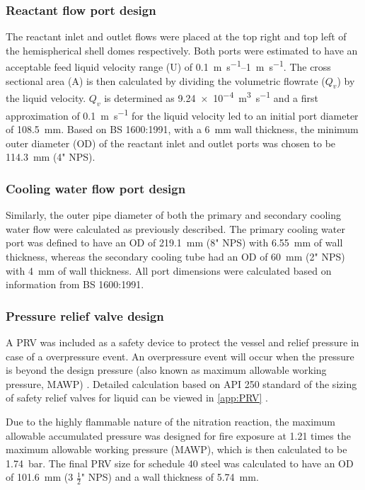 \subsubsection{Reactant flow port design}
The reactant inlet and outlet flows were placed at the top right and top left of the hemispherical shell domes respectively. Both ports were estimated to have an acceptable feed liquid velocity range (U) of \SIrange{0.1}{1}{\m\per\s}. The cross sectional area (A) is then calculated by dividing the volumetric flowrate ($Q_v$) by the liquid velocity. $Q_v$ is determined as \SI{9.24e-4}{\cubic\m\per\s} and a first approximation of \SI{0.1}{\m\per\s} for the liquid velocity led to an initial port diameter of \SI{108.5}{\milli \metre}. Based on BS 1600:1991, with a \SI{6}{\milli \metre} wall thickness, the minimum outer diameter (OD) of the reactant inlet and outlet ports was chosen to be \SI{114.3}{\milli \metre} (4" NPS). 

\subsubsection{Cooling water flow port design}
Similarly, the outer pipe diameter of both the primary and secondary cooling water flow were calculated as previously described. The primary cooling water port was defined to have an OD of \SI{219.1}{\milli \metre} (8" NPS) with \SI{6.55}{\milli \metre} of wall thickness, whereas the secondary cooling tube had an OD of \SI{60}{\milli \metre} (2" NPS) with \SI{4}{\milli \metre} of wall thickness. All port dimensions were calculated based on information from BS 1600:1991. 

\subsubsection{Pressure relief valve design}
A PRV was included as a safety device to protect the vessel and relief pressure in case of a overpressure event. An overpressure event will occur when the pressure is beyond the design pressure (also known as maximum allowable working pressure, MAWP) \cite{marsha_lecture_nodate}. Detailed calculation based on API 250 standard of the sizing of safety relief valves for liquid can be viewed in \ref{app:PRV} \cite{api_standard_520_sizing_2013}.

Due to the highly flammable nature of the nitration reaction, the maximum allowable accumulated pressure was designed for fire exposure at 1.21 times the maximum allowable working pressure (MAWP), which is then calculated to be \SI{1.74}{\bar}. The final PRV size for schedule 40 steel was calculated to have an OD of \SI{101.6}{\milli \metre} (3 $\frac{1}{2}$" NPS) and a wall thickness of \SI{5.74}{\milli \metre}.

